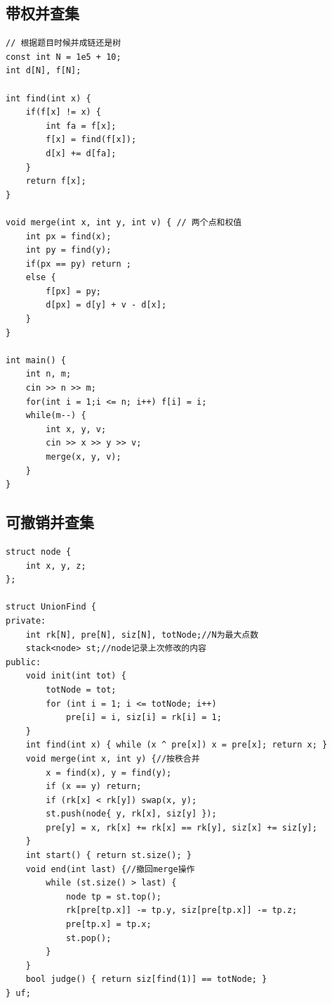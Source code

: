 \documentclass[twoside]{article}
\begin{document}
\subsection{带权并查集}
\begin{lstlisting}
// 根据题目时候并成链还是树
const int N = 1e5 + 10;
int d[N], f[N];

int find(int x) {
    if(f[x] != x) {
        int fa = f[x];
        f[x] = find(f[x]);
        d[x] += d[fa];
    }
    return f[x];
}

void merge(int x, int y, int v) { // 两个点和权值
    int px = find(x);
    int py = find(y);
    if(px == py) return ;
    else {
        f[px] = py;
        d[px] = d[y] + v - d[x];
    }
}

int main() {
    int n, m;
    cin >> n >> m;
    for(int i = 1;i <= n; i++) f[i] = i;
    while(m--) {
        int x, y, v;
        cin >> x >> y >> v;
        merge(x, y, v);
    }
}
\end{lstlisting}
\subsection{可撤销并查集}
\begin{lstlisting}
struct node {
    int x, y, z;
};

struct UnionFind {
private:
    int rk[N], pre[N], siz[N], totNode;//N为最大点数
    stack<node> st;//node记录上次修改的内容
public:
    void init(int tot) {
        totNode = tot;
        for (int i = 1; i <= totNode; i++)
            pre[i] = i, siz[i] = rk[i] = 1;
    }
    int find(int x) { while (x ^ pre[x]) x = pre[x]; return x; }
    void merge(int x, int y) {//按秩合并
        x = find(x), y = find(y);
        if (x == y) return;
        if (rk[x] < rk[y]) swap(x, y);
        st.push(node{ y, rk[x], siz[y] });
        pre[y] = x, rk[x] += rk[x] == rk[y], siz[x] += siz[y];
    }
    int start() { return st.size(); }
    void end(int last) {//撤回merge操作
        while (st.size() > last) {
            node tp = st.top();
            rk[pre[tp.x]] -= tp.y, siz[pre[tp.x]] -= tp.z;
            pre[tp.x] = tp.x;
            st.pop();
        }
    }
    bool judge() { return siz[find(1)] == totNode; }
} uf;
\end{lstlisting}
\end{document}
